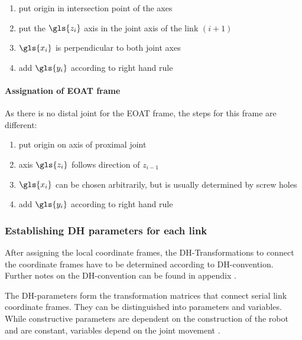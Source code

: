 \begin{itemize}[wide=\parindent]
	\begin{enumerate}[label=\emph{\alph*)}]
		\item put origin in intersection point of the axes
		\item put the $\gls{z_i}$ axis in the joint axis of the link $(i+1)$
		\item $\gls{x_i}$ is perpendicular to both joint axes
		\item add $\gls{y_i}$ according to right hand rule
	\end{enumerate}
\end{itemize}





\paragraph{Assignation of \ac{EOAT} frame}
As there is no distal joint for the \ac{EOAT} frame, the steps for this frame are different:

\begin{enumerate}[label=\emph{\alph*)}]
	\item put origin on axis of proximal joint 
	\item axis $\gls{z_i}$ follows direction of $z_{i-1}$
	\item $\gls{x_i}$ can be chosen arbitrarily, but is usually determined by screw holes
	\item add $\gls{y_i}$ according to right hand rule
\end{enumerate}


\subsubsection{Establishing \ac{DH} parameters for each link} \label{sec:DHparPerLink}

After assigning the local coordinate frames, the \ac{DH}-Transformations to connect the coordinate frames have to be determined according to \ac{DH}-convention.
Further notes on the \ac{DH}-convention can be found in appendix .




The \ac{DH}-parameters form the transformation matrices that connect serial link coordinate frames. They can be distinguished into parameters and variables. While constructive parameters are dependent on the construction of the robot and are constant, variables depend on the joint movement \cite{FwdInvAnalysRobManip} \cite{ConstantinForwardKA} \cite{DenavitHartenbergKonventionen}.

